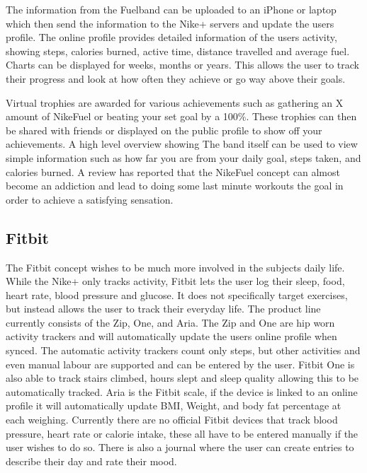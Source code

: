 
The information from the Fuelband can be uploaded to an iPhone or laptop which then send the information to the Nike+ servers and update the users profile. The online profile provides detailed information of the users activity, showing steps, calories burned, active time, distance travelled and average fuel. Charts can be displayed for weeks, months or years. This allows the user to track their progress and look at how often they achieve or go way above their goals.\cite{fuelbandTechSpce} 
 
 
Virtual trophies are awarded for various achievements such as gathering an X amount of NikeFuel or beating your set goal by a 100\%. These trophies can then be shared with friends or displayed on the public profile to show off your achievements. A high level overview showing  The band itself can be used to view simple information such as how far you are from your daily goal, steps taken, and calories burned. A review has reported that the NikeFuel concept can almost become an addiction and lead to doing some last minute workouts the goal in order to achieve a satisfying sensation. \cite{fuelbandDcRain}

\subsection{Fitbit}
The Fitbit concept wishes to be much more involved in the subjects daily life. While the Nike+ only tracks activity, Fitbit lets the user log their sleep, food, heart rate, blood pressure and glucose. It does not specifically target exercises, but instead allows the user to track their everyday life. The product line currently consists of the Zip, One, and Aria. The Zip and One are hip worn activity trackers and will automatically update the users online profile when synced. The automatic activity trackers count only steps, but other activities and even manual labour are supported and can be entered by the user. Fitbit One is also able to track stairs climbed, hours slept and sleep quality allowing this to be automatically tracked. Aria is the Fitbit scale, if the device is linked to an online profile it will automatically update BMI, Weight, and body fat percentage at each weighing. Currently there are no official Fitbit devices that track blood pressure, heart rate or calorie intake, these all have to be entered manually if the user wishes to do so. There is also a journal where the user can create entries to describe their day and rate their mood.



